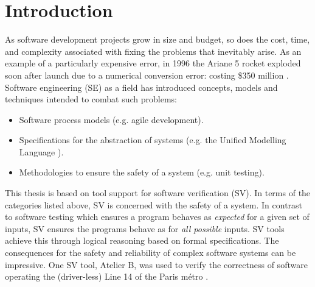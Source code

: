 
\chapter{Introduction} %
\thispagestyle{nohead}
\label{Intro} %


\newcommand{\keyword}[1]{\textbf{#1}}
\newcommand{\tabhead}[1]{\textbf{#1}}
\newcommand{\code}[1]{\texttt{#1}}
\newcommand{\file}[1]{\texttt{\bfseries#1}}
\newcommand{\option}[1]{\texttt{\itshape#1}}
As software development projects grow in size and budget, so does the cost, time, and complexity associated with fixing the problems that inevitably arise.
As an example of a particularly expensive error, in 1996 the Ariane 5 rocket exploded soon after launch due to a numerical conversion error: costing \$350 million \cite{Charette:2005:WSF:2241236.2242319}. 
Software engineering (SE) as a field has introduced concepts, models and techniques intended to combat such problems:
\begin{itemize}
	\item Software process models (e.g. agile development).
	\item Specifications for the abstraction of systems (e.g. the Unified Modelling Language \cite{UML}).
	\item Methodologies to ensure the safety of a system (e.g. unit testing).
\end{itemize}
This thesis is based on tool support for software verification (SV). 
In terms of the categories listed above, SV is concerned with the safety of a system.
In contrast to software testing which ensures a program behaves as \textit{expected} for a given set of inputs, SV ensures the programs behave as  for \textit{all possible} inputs.
SV tools achieve this through logical reasoning based on formal specifications.
The consequences for the safety and reliability of complex software systems can be impressive. 
One SV tool, Atelier B, was used to verify the correctness of software operating the (driver-less) Line 14 of the Paris m\'etro \cite{Atelier-B}. 
 
